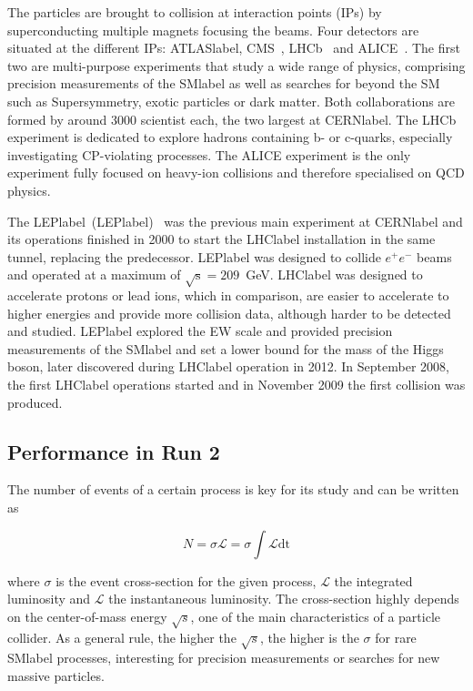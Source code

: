 The particles are brought to collision at interaction points (IPs) by superconducting multiple magnets focusing the beams. Four detectors are situated at the different IPs: \acrshort{ATLASlabel}, CMS~\cite{CMSmachine}, LHCb~\cite{LHCbmachine} and ALICE~\cite{ALICEmachine}. The first two are multi-purpose experiments that study a wide range of physics, comprising precision measurements of the \acrshort{SMlabel} as well as searches for beyond the SM such as Supersymmetry, exotic particles or dark matter. Both collaborations are formed by around 3000 scientist each, the two largest at \acrshort{CERNlabel}. The LHCb experiment is dedicated to explore hadrons containing b- or c-quarks, especially investigating CP-violating processes. The ALICE experiment is the only experiment fully focused on heavy-ion collisions and therefore specialised on QCD physics. 

The \acrlong{LEPlabel}~(\acrshort{LEPlabel})~\cite{LEPmachine} was the previous main experiment at \acrshort{CERNlabel} and its operations finished in 2000 to start the \acrshort{LHClabel} installation in the same tunnel, replacing the predecessor. \acrshort{LEPlabel} was designed to collide $e^+e^-$ beams and operated at a maximum of $\sqrt{\text{s}}=209$~GeV. \acrshort{LHClabel} was designed to accelerate protons or lead ions, which in comparison, are easier to accelerate to higher energies and provide more collision data, although harder to be detected and studied. \acrshort{LEPlabel} explored the \acrshort{EW} scale and provided precision measurements of the \acrshort{SMlabel} and set a lower bound for the mass of the Higgs boson, later discovered during \acrshort{LHClabel} operation in 2012. In September 2008, the first \acrshort{LHClabel} operations started and in November 2009 the first collision was produced. 

\subsection{Performance in Run 2}

The number of events of a certain process is key for its study and can be written as

\begin{equation}
    N = \sigma\mathscr{L} = \sigma \int \mathcal{L} \text{dt}
\end{equation}

where $\sigma$ is the event cross-section for the given process, $\mathscr{L}$ the integrated luminosity and $\mathcal{L}$ the instantaneous luminosity. The cross-section highly depends on the center-of-mass energy $\sqrt{s}$, one of the main characteristics of a particle collider. As a general rule, the higher the $\sqrt{s}$, the higher is the $\sigma$ for rare \acrshort{SMlabel} processes, interesting for precision measurements or searches for new massive particles.

